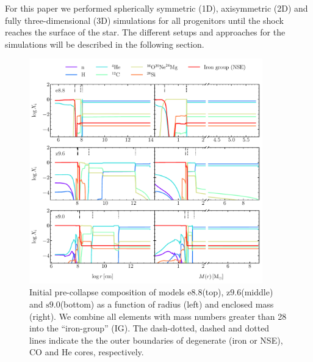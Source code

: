 \documentclass[fleqn,usenatbib]{mnras}
\newcommand{\onemg}{\ensuremath{\mathrm{e8.8}}\xspace}
\newcommand{\snine}{\ensuremath{\mathrm{s9.0}}\xspace}
\newcommand{\znine}{\ensuremath{\mathrm{z9.6}}\xspace}
\begin{document}
For this paper we performed spherically symmetric (1D), 
axisymmetric (2D) and fully three-dimensional (3D) 
simulations for all progenitors until the shock reaches 
the surface of the star. The different setups and approaches 
for the simulations will be described in the following section.
\begin{figure} %
 \centering
 \includegraphics[width=0.9\textwidth,trim=0cm 0.0cm 0cm 0cm,clip]{./pic/composition_all.pdf}
 \caption{Initial pre-collapse composition of models 
 \onemg (top), \znine (middle) and \snine (bottom) as a function 
 of radius (left) and enclosed mass (right). We combine all elements 
 with mass numbers greater than 28 into the ``iron-group'' (IG). The 
 dash-dotted, dashed and dotted lines indicate the the outer 
 boundaries of degenerate (iron or NSE), CO and He cores, respectively.}
 \label{fig:composition_all}
\end{figure}
\end{document}
